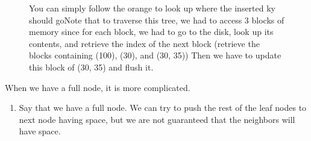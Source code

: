 \begin{algo}[Insertion]
\begin{figure}[H]
        \caption{You can simply follow the orange to look up where the inserted ky should goNote that to traverse this tree, we had to access 3 blocks of memory since for each block, we had to go to the disk, look up its contents, and retrieve the index of the next block (retrieve the blocks containing (100), (30), and (30, 35)) Then we have to update this block of (30, 35) and flush it. }
        \label{fig:insertion_easy}
      \end{figure}

      When we have a full node, it is more complicated. 
      \begin{enumerate}
        \item Say that we have a full node. We can try to push the rest of the leaf nodes to next node having space, but we are not guaranteed that the neighbors will have space. 

        \begin{figure}[H]
          \centering
\end{figure}
\end{enumerate}
\end{algo}
